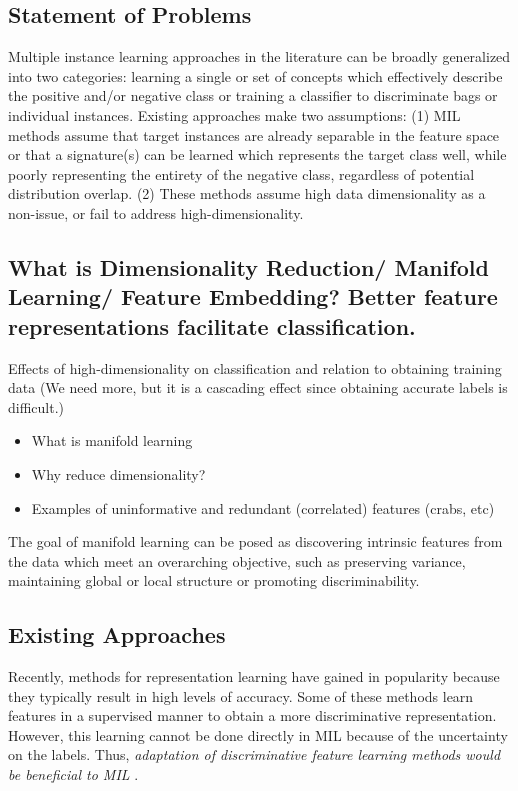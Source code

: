 \subsection{Statement of Problems}
Multiple instance learning approaches in the literature can be broadly generalized into two categories: learning a single or set of concepts which effectively describe the positive and/or negative class or training a classifier to discriminate bags or individual instances.  Existing approaches make two assumptions:  (1) MIL methods assume that target instances are already separable in the feature space or that a signature(s) can be learned which represents the target class well, while poorly representing the entirety of the negative class, regardless of potential distribution overlap. (2) These methods assume high data dimensionality as a non-issue, or fail to address high-dimensionality.

\subsection{What is Dimensionality Reduction/ Manifold Learning/ Feature Embedding?  Better feature representations facilitate classification.}

Effects of high-dimensionality on classification and relation to obtaining training data (We need more, but it is a cascading effect since obtaining accurate labels is difficult.)

\begin{itemize}
	\item What is manifold learning
	\item Why reduce dimensionality?
	\item Examples of uninformative and redundant (correlated) features (crabs, etc)
\end{itemize}


The goal of manifold learning can be posed as discovering intrinsic features from the data which meet an overarching objective, such as preserving variance, maintaining global or local structure  or promoting discriminability.

\subsection{Existing Approaches}
Recently, methods for representation learning have gained in popularity because they typically result in high levels of accuracy.  Some of these methods  learn features in a supervised manner to obtain a more discriminative representation.  However, this learning cannot be done directly in  MIL because of the uncertainty on the labels.  Thus, \textit{adaptation of discriminative  feature learning methods would be beneficial to MIL} \cite{Carbonneau2016MILSurvey}.

